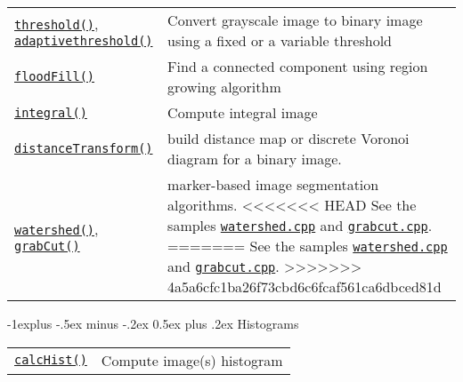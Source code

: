 \documentclass[10pt,landscape]{article}
\makeatletter
\renewcommand{\subsection}{\@startsection{subsection}{2}{0mm}%
                                {-1explus -.5ex minus -.2ex}%
                                {0.5ex plus .2ex}%
                                {\normalfont\normalsize\bfseries}}
\makeatother
\begin{document}
\begin{multicols}{3}
\begin{tabular}{@{}p{\the\MyLen}%
                @{}p{\linewidth-\the\MyLen}@{}}
\texttt{\href{http://docs.opencv.org/modules/imgproc/doc/miscellaneous_transformations.html\#threshold}{threshold()}}, \texttt{\href{http://docs.opencv.org/modules/imgproc/doc/miscellaneous_transformations.html\#adaptivethreshold}{adaptivethreshold()}} & Convert grayscale image to binary image using a fixed or a variable threshold \\

\texttt{\href{http://docs.opencv.org/modules/imgproc/doc/miscellaneous_transformations.html\#floodfill}{floodFill()}} & Find a connected component using region growing algorithm\\

\texttt{\href{http://docs.opencv.org/modules/imgproc/doc/miscellaneous_transformations.html\#integral}{integral()}} & Compute integral image \\

\texttt{\href{http://docs.opencv.org/modules/imgproc/doc/miscellaneous_transformations.html\#distancetransform}{distanceTransform()}}
 & build distance map or discrete Voronoi diagram for a binary image. \\

\texttt{\href{http://docs.opencv.org/modules/imgproc/doc/miscellaneous_transformations.html\#watershed}{watershed()}},
\texttt{\href{http://docs.opencv.org/modules/imgproc/doc/miscellaneous_transformations.html\#grabcut}{grabCut()}}
 & marker-based image segmentation algorithms.
<<<<<<< HEAD
 See the samples \texttt{\href{https://github.com/Itseez/opencv/tree/master/samples/cpp/watershed.cpp}{watershed.cpp}} and \texttt{\href{https://github.com/Itseez/opencv/tree/master/samples/cpp/grabcut.cpp}{grabcut.cpp}}.
=======
 See the samples \texttt{\href{https://github.com/opencv/opencv/tree/master/samples/cpp/watershed.cpp}{watershed.cpp}} and \texttt{\href{https://github.com/opencv/opencv/tree/master/samples/cpp/grabcut.cpp}{grabcut.cpp}}.
>>>>>>> 4a5a6cfc1ba26f73cbd6c6fcaf561ca6dbced81d

\end{tabular}

\subsection{Histograms}

\begin{tabular}{@{}p{\the\MyLen}%
                @{}p{\linewidth-\the\MyLen}@{}}

\texttt{\href{http://docs.opencv.org/modules/imgproc/doc/histograms.html\#calchist}{calcHist()}} & Compute image(s) histogram \\


\end{tabular}
\end{multicols}
\end{document}
